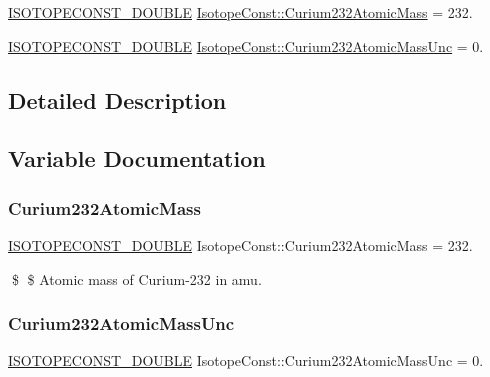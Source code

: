 \begin{DoxyCompactItemize}
\item 
\mbox{\hyperlink{group___isotope_const-_macros_ga8f45a7272ce02c0b4c65c44636ed719a}{I\+S\+O\+T\+O\+P\+E\+C\+O\+N\+S\+T\+\_\+\+D\+O\+U\+B\+LE}} \mbox{\hyperlink{group___isotope_const-_curium-_cm232_gac87e17b8e20bbfc08568eed5b6de34d0}{Isotope\+Const\+::\+Curium232\+Atomic\+Mass}} = 232.
\item 
\mbox{\hyperlink{group___isotope_const-_macros_ga8f45a7272ce02c0b4c65c44636ed719a}{I\+S\+O\+T\+O\+P\+E\+C\+O\+N\+S\+T\+\_\+\+D\+O\+U\+B\+LE}} \mbox{\hyperlink{group___isotope_const-_curium-_cm232_ga0ef7953d92fe70ecc40ca26840f33eed}{Isotope\+Const\+::\+Curium232\+Atomic\+Mass\+Unc}} = 0.
\end{DoxyCompactItemize}


\subsection{Detailed Description}


\subsection{Variable Documentation}
\mbox{\label{group___isotope_const-_curium-_cm232_gac87e17b8e20bbfc08568eed5b6de34d0}} 
\subsubsection{\texorpdfstring{Curium232\+Atomic\+Mass}{Curium232AtomicMass}}
{\footnotesize\ttfamily \mbox{\hyperlink{group___isotope_const-_macros_ga8f45a7272ce02c0b4c65c44636ed719a}{I\+S\+O\+T\+O\+P\+E\+C\+O\+N\+S\+T\+\_\+\+D\+O\+U\+B\+LE}} Isotope\+Const\+::\+Curium232\+Atomic\+Mass = 232.}

\$ \$ Atomic mass of Curium-\/232 in amu. \mbox{\label{group___isotope_const-_curium-_cm232_ga0ef7953d92fe70ecc40ca26840f33eed}} 
\subsubsection{\texorpdfstring{Curium232\+Atomic\+Mass\+Unc}{Curium232AtomicMassUnc}}
{\footnotesize\ttfamily \mbox{\hyperlink{group___isotope_const-_macros_ga8f45a7272ce02c0b4c65c44636ed719a}{I\+S\+O\+T\+O\+P\+E\+C\+O\+N\+S\+T\+\_\+\+D\+O\+U\+B\+LE}} Isotope\+Const\+::\+Curium232\+Atomic\+Mass\+Unc = 0.}

